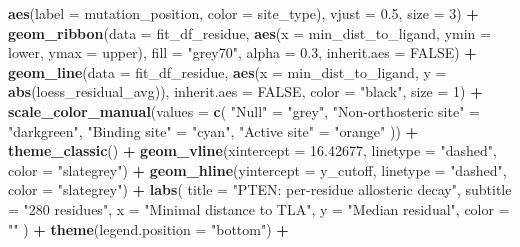 \documentclass[
]{article}
\newenvironment{Shaded}{\begin{snugshade}}{\end{snugshade}}
\newcommand{\AttributeTok}[1]{\textcolor[rgb]{0.13,0.29,0.53}{#1}}
\newcommand{\ConstantTok}[1]{\textcolor[rgb]{0.56,0.35,0.01}{#1}}
\newcommand{\DecValTok}[1]{\textcolor[rgb]{0.00,0.00,0.81}{#1}}
\newcommand{\FloatTok}[1]{\textcolor[rgb]{0.00,0.00,0.81}{#1}}
\newcommand{\FunctionTok}[1]{\textcolor[rgb]{0.13,0.29,0.53}{\textbf{#1}}}
\newcommand{\NormalTok}[1]{#1}
\newcommand{\OtherTok}[1]{\textcolor[rgb]{0.56,0.35,0.01}{#1}}
\newcommand{\SpecialCharTok}[1]{\textcolor[rgb]{0.81,0.36,0.00}{\textbf{#1}}}
\newcommand{\StringTok}[1]{\textcolor[rgb]{0.31,0.60,0.02}{#1}}
\begin{document}
\begin{Shaded}
\begin{Highlighting}[]
                  \FunctionTok{aes}\NormalTok{(}\AttributeTok{label =}\NormalTok{ mutation\_position, }\AttributeTok{color =}\NormalTok{ site\_type), }\AttributeTok{vjust =} \FloatTok{0.5}\NormalTok{, }\AttributeTok{size =} \DecValTok{3}\NormalTok{) }\SpecialCharTok{+}
  \FunctionTok{geom\_ribbon}\NormalTok{(}\AttributeTok{data =}\NormalTok{ fit\_df\_residue,}
            \FunctionTok{aes}\NormalTok{(}\AttributeTok{x =}\NormalTok{ min\_dist\_to\_ligand, }\AttributeTok{ymin =}\NormalTok{ lower, }\AttributeTok{ymax =}\NormalTok{ upper),}
            \AttributeTok{fill =} \StringTok{"grey70"}\NormalTok{, }\AttributeTok{alpha =} \FloatTok{0.3}\NormalTok{, }\AttributeTok{inherit.aes =} \ConstantTok{FALSE}\NormalTok{) }\SpecialCharTok{+}
  \FunctionTok{geom\_line}\NormalTok{(}\AttributeTok{data =}\NormalTok{ fit\_df\_residue, }\FunctionTok{aes}\NormalTok{(}\AttributeTok{x =}\NormalTok{ min\_dist\_to\_ligand, }\AttributeTok{y =} \FunctionTok{abs}\NormalTok{(loess\_residual\_avg)),}
          \AttributeTok{inherit.aes =} \ConstantTok{FALSE}\NormalTok{, }\AttributeTok{color =} \StringTok{"black"}\NormalTok{, }\AttributeTok{size =} \DecValTok{1}\NormalTok{) }\SpecialCharTok{+}
  \FunctionTok{scale\_color\_manual}\NormalTok{(}\AttributeTok{values =} \FunctionTok{c}\NormalTok{(}
    \StringTok{"Null"} \OtherTok{=} \StringTok{"grey"}\NormalTok{,}
    \StringTok{"Non{-}orthosteric site"} \OtherTok{=} \StringTok{"darkgreen"}\NormalTok{,}
    \StringTok{"Binding site"} \OtherTok{=} \StringTok{"cyan"}\NormalTok{,}
    \StringTok{"Active site"} \OtherTok{=} \StringTok{"orange"}
\NormalTok{  )) }\SpecialCharTok{+}
  \FunctionTok{theme\_classic}\NormalTok{() }\SpecialCharTok{+}
  \FunctionTok{geom\_vline}\NormalTok{(}\AttributeTok{xintercept =} \FloatTok{16.42677}\NormalTok{, }\AttributeTok{linetype =} \StringTok{"dashed"}\NormalTok{, }\AttributeTok{color =} \StringTok{"slategrey"}\NormalTok{) }\SpecialCharTok{+}
  \FunctionTok{geom\_hline}\NormalTok{(}\AttributeTok{yintercept =}\NormalTok{ y\_cutoff, }\AttributeTok{linetype =} \StringTok{"dashed"}\NormalTok{, }\AttributeTok{color =} \StringTok{"slategrey"}\NormalTok{) }\SpecialCharTok{+}
  \FunctionTok{labs}\NormalTok{(}
    \AttributeTok{title =} \StringTok{"PTEN: per{-}residue allosteric decay"}\NormalTok{,}
    \AttributeTok{subtitle =} \StringTok{"280 residues"}\NormalTok{,}
    \AttributeTok{x =} \StringTok{"Minimal distance to TLA"}\NormalTok{,}
    \AttributeTok{y =} \StringTok{"Median residual"}\NormalTok{,}
    \AttributeTok{color =} \StringTok{""}
\NormalTok{  )  }\SpecialCharTok{+} \FunctionTok{theme}\NormalTok{(}\AttributeTok{legend.position =} \StringTok{"bottom"}\NormalTok{) }\SpecialCharTok{+}

\end{Highlighting}
\end{Shaded}
\end{document}
